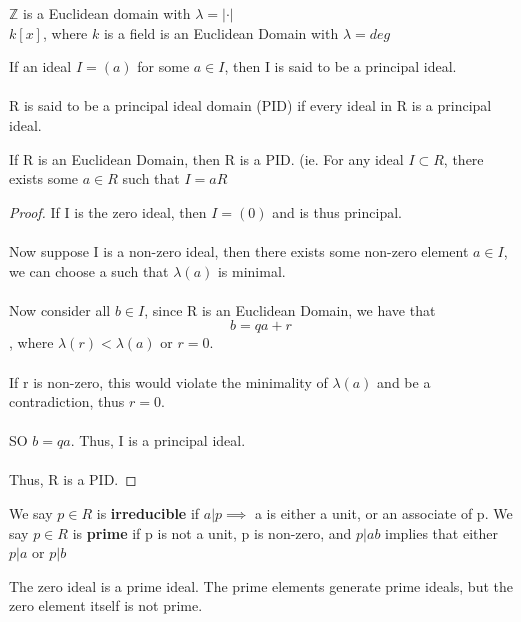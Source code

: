 \begin{example}
$\mathbb{Z}$ is a Euclidean domain with $\lambda = |\cdot|$\\
$k[x]$, where $k$ is a field is an Euclidean Domain with $\lambda = deg$
\end{example}

\begin{definition}
If an ideal $I = (a)$ for some $a \in I$, then I is said to be a principal ideal.\\\\
R is said to be a principal ideal domain (PID) if every ideal in R is a principal ideal.
\end{definition}

\begin{proposition}
If R is an Euclidean Domain, then R is a PID. (ie. For any ideal $I \subset R$, there exists some $a \in R$ such that $I = aR$
\end{proposition}

\begin{proof}
If I is the zero ideal, then $I = (0)$ and is thus principal.\\\\
Now suppose I is a non-zero ideal, then there exists some non-zero element $a \in I$, we can choose a such that $\lambda(a)$ is minimal.\\\\
Now consider all $b \in I$, since R is an Euclidean Domain, we have that
\[b = qa + r\]
, where $\lambda(r) < \lambda(a)$ or $r = 0$.\\\\
If r is non-zero, this would violate the minimality of $\lambda(a)$ and be a contradiction, thus $r = 0$.\\\\
SO $b = qa$. Thus, I is a principal ideal.\\\\
Thus, R is a PID.
\end{proof}

\begin{definition}
We say $p \in R$ is \textbf{irreducible} if $a | p \implies $ a is either a unit, or an associate of p. We say $p \in R$ is \textbf{prime} if p is not a unit, p is non-zero, and $p | ab$ implies that either $p | a$ or $p | b$
\end{definition}

\begin{remark}
The zero ideal is a prime ideal. The prime elements generate prime ideals, but the zero element itself is not prime.
\end{remark}

